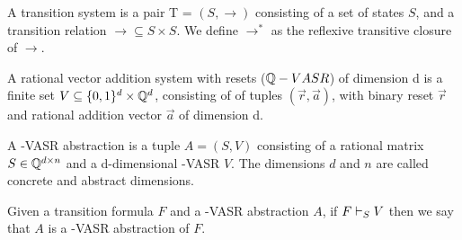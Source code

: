\begin{mydef}
A transition system is a pair T = $(S, \rightarrow)$ consisting of a set of states $S$, and a transition relation $\rightarrow \subseteq S \times S$. We define $\rightarrow^*$ as the reflexive transitive closure of $\rightarrow$.
\end{mydef}

\begin{mydef}
A rational vector addition system with resets ($\mathbb{Q}-VASR$) of dimension d is a finite set $V \subseteq \{0, 1\}^d \times \mathbb{Q}^d$, consisting of of tuples $(\vec{r}, \vec{a})$, with binary reset $\vec{r}$ and rational addition vector $\vec{a}$ of dimension d.
\end{mydef}

\begin{mydef}
A \Q-VASR abstraction is a tuple $A = (S, V)$ consisting of a rational matrix $S \in \mathbb{Q}^{d \times n}$ and a d-dimensional \Q-VASR $V$. The dimensions $d$ and $n$ are called concrete and abstract dimensions.
\end{mydef}

Given a transition formula $F$ and a \Q-VASR abstraction $A$, if $F \vdash_{S} V$ then we say that $A$ is a \Q-VASR abstraction of $F$.